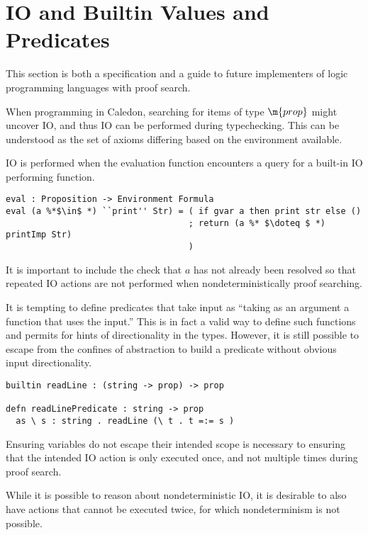 \section{IO and Builtin Values and Predicates}
 
This section is both a specification and a guide 
to future implementers of logic programming languages with proof search.

When programming in Caledon, searching for items of type $\m{prop}$ 
might uncover IO, and thus IO can be performed during typechecking.  
This can be understood as the set of axioms differing based on the environment available.

IO is performed when the evaluation function encounters a query for a built-in IO performing function.

\begin{lstlisting}
eval : Proposition -> Environment Formula
eval (a %*$\in$ *) ``print'' Str) = ( if gvar a then print str else ()
                                    ; return (a %* $\doteq $ *) printImp Str)
                                    )
\end{lstlisting}

It is important to include the check that $a$ has not already been resolved so that repeated IO actions are not performed
when nondeterministically proof searching.  

It is tempting to define predicates that take input as ``taking as an argument 
a function that uses the input.''  This is in fact a valid way to define such functions 
and permits for hints of directionality in the types.  
However, it is still possible to escape from the confines of abstraction to build a predicate without 
obvious input directionality.  

\begin{lstlisting}
builtin readLine : (string -> prop) -> prop

defn readLinePredicate : string -> prop
  as \ s : string . readLine (\ t . t =:= s )

\end{lstlisting}

Ensuring variables do not escape their intended scope is necessary to ensuring
that the intended IO action is only executed once, and not multiple times during proof search.

While it is possible to reason about nondeterministic IO, it is desirable to also have actions
that cannot be executed twice, for which nondeterminism is not possible.

